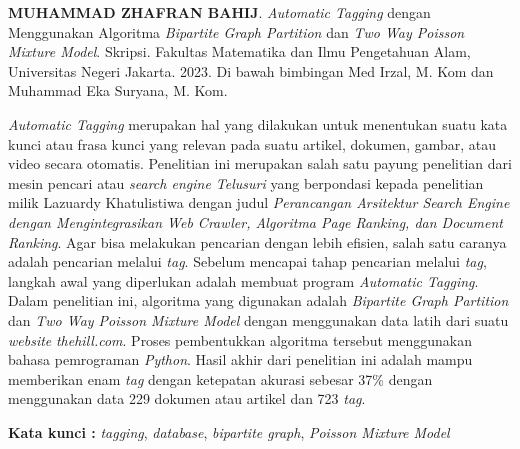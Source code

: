 \documentclass{jtetiskripsi}
\begin{document}
\begin{abstractind}
\textbf{MUHAMMAD ZHAFRAN BAHIJ}. \emph{Automatic Tagging} dengan Menggunakan Algoritma \emph{Bipartite Graph Partition} dan \emph{Two Way Poisson Mixture Model}. Skripsi. Fakultas Matematika dan Ilmu Pengetahuan Alam, Universitas Negeri Jakarta. 2023. Di bawah bimbingan Med Irzal, M. Kom dan Muhammad Eka Suryana, M. Kom.
\vskip1cm

  \textit{Automatic Tagging} merupakan hal yang dilakukan untuk menentukan
  suatu kata kunci atau frasa kunci yang relevan pada suatu artikel, dokumen, gambar,
  atau video secara otomatis. Penelitian ini merupakan salah satu payung penelitian dari
  mesin pencari atau \textit{search engine Telusuri} yang berpondasi kepada penelitian milik
  Lazuardy Khatulistiwa dengan judul \textit{Perancangan Arsitektur Search Engine dengan 
  Mengintegrasikan Web Crawler, Algoritma Page Ranking, dan Document Ranking}.
  Agar bisa melakukan pencarian dengan lebih efisien, salah satu caranya adalah pencarian melalui \textit{tag}. 
  Sebelum mencapai tahap pencarian melalui \textit{tag},
  langkah awal yang diperlukan adalah membuat program \textit{Automatic Tagging}. Dalam penelitian ini, 
  algoritma yang digunakan adalah \textit{Bipartite Graph Partition} dan \textit{Two Way Poisson Mixture Model} dengan
  menggunakan data latih dari suatu \textit{website} \textit{thehill.com}. Proses pembentukkan algoritma tersebut
  menggunakan bahasa pemrograman \textit{Python}. Hasil akhir dari penelitian ini adalah mampu memberikan enam 
  \textit{tag} dengan ketepatan akurasi sebesar 37\% dengan menggunakan data 229 dokumen atau artikel dan 723 \textit{tag}. 

  
	\bigskip
	\noindent

	\textbf{Kata kunci :} \textit{tagging}, \textit{database}, \textit{bipartite graph}, \textit{Poisson Mixture Model}
\end{abstractind}
\end{document}
